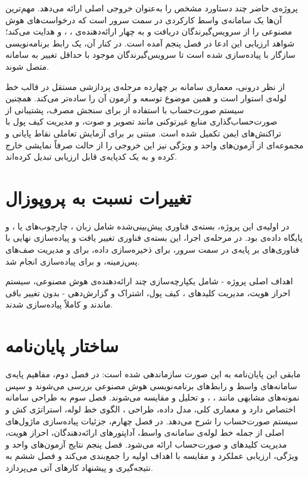 پروژه‌ی حاضر چند دستاورد مشخص را به‌عنوان خروجی اصلی ارائه می‌دهد. مهم‌ترین
آن‌ها یک سامانه‌ی واسط کارکردی در سمت سرور است که درخواست‌های هوش مصنوعی
را از سرویس‌گیرندگان دریافت و به چهار ارائه‌دهنده‌ی ،
،  و  هدایت می‌کند؛ شواهد ارزیابی این
ادعا در فصل پنجم آمده است. در کنار آن، یک رابط برنامه‌نویسی سازگار با
 پیاده‌سازی شده است تا سرویس‌گیرندگان موجود با حداقل تغییر به
سامانه متصل شوند.

از نظر درونی، معماری سامانه بر چهارده مرحله‌ی پردازشی مستقل در قالب خط
لوله‌ی  استوار است و همین موضوع توسعه و آزمون آن را ساده‌تر
می‌کند. همچنین سیستم صورت‌حساب با استفاده از
 برای سنجش مصرف، پشتیبانی از
صورت‌حساب‌گذاری منابع غیرتوکنی مانند تصویر و صوت، و مدیریت کیف پول با
تراکنش‌های ایمن تکمیل شده است.  مبتنی بر  برای
آزمایش تعاملی نقاط پایانی و مجموعه‌ای از آزمون‌های واحد و ویژگی نیز این
خروجی را از حالت صرفاً نمایشی خارج کرده و به یک کدپایه‌ی قابل ارزیابی
تبدیل کرده‌اند.

\section{تغییرات نسبت به پروپوزال}
\label{sec:changes}

در  اولیه‌ی این پروژه، بسته‌ی فناوری پیش‌بینی‌شده
شامل زبان ، چارچوب‌های  یا ، و پایگاه
داده‌ی  بود. در مرحله‌ی اجرا، این بسته‌ی فناوری تغییر یافت و
پیاده‌سازی نهایی با فناوری‌های  بر پایه‌ی  در سمت
سرور،  برای ذخیره‌سازی داده،  برای
 و مدیریت صف‌های پس‌زمینه، و 
برای پیاده‌سازی  انجام شد.

اهداف اصلی پروژه - شامل یکپارچه‌سازی چند ارائه‌دهنده‌ی هوش مصنوعی، سیستم
احراز هویت، مدیریت کلیدهای ، کیف پول، اشتراک و گزارش‌دهی - بدون
تغییر باقی ماندند و کاملاً پیاده‌سازی شدند.

\section{ساختار پایان‌نامه}
\label{sec:structure}

مابقی این پایان‌نامه به این صورت سازماندهی شده است: در فصل دوم، مفاهیم
پایه‌ی سامانه‌های واسط و رابط‌های برنامه‌نویسی هوش مصنوعی بررسی می‌شوند و
سپس نمونه‌های مشابهی مانند ، ،
 و  تحلیل و مقایسه می‌شوند. فصل سوم به
طراحی سامانه اختصاص دارد و معماری کلی، مدل داده، طراحی ، الگوی
خط لوله، استراتژی کش و سیستم صورت‌حساب را شرح می‌دهد. در فصل چهارم،
جزئیات پیاده‌سازی ماژول‌های اصلی از جمله خط لوله‌ی سامانه‌ی واسط،
آداپتورهای ارائه‌دهندگان، احراز هویت، مدیریت کلیدهای  و
صورت‌حساب ارائه می‌شود. فصل پنجم نتایج آزمون‌های واحد و ویژگی، ارزیابی
عملکرد و مقایسه با اهداف اولیه را جمع‌بندی می‌کند و فصل ششم به نتیجه‌گیری
و پیشنهاد کارهای آتی می‌پردازد.
